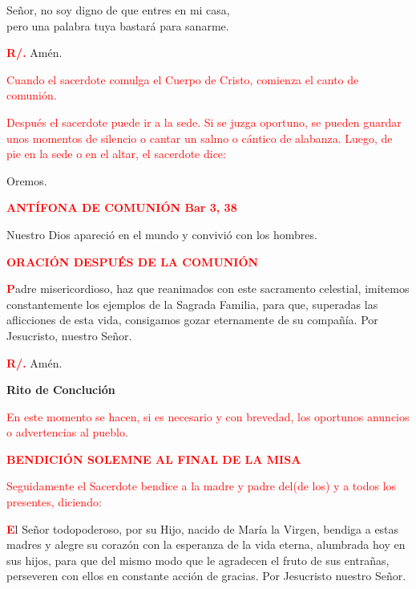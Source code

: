 \documentclass[12pt, letterpaper]{report}
\begin{document}
\noindent
\Large Se\~nor, no soy digno de que entres en mi casa,\\ 
pero una palabra tuya bastar\'a para sanarme.

\Large {\bfseries \textcolor{red}{R/.}} \hspace{0.5cm} Am\'en.

\large{\textcolor{red}{Cuando el sacerdote comulga el Cuerpo de Cristo, comienza el canto de comuni\'on.}}

\large{\textcolor{red}{Despu\'es el sacerdote puede ir a la sede. Si se juzga oportuno, se pueden guardar unos momentos de silencio o cantar un salmo o c\'antico de alabanza. Luego, de pie en la sede o en el altar, el sacerdote dice:}}

\noindent
\Large Oremos.

\large {\bfseries \textcolor{red}{ANT\'IFONA DE COMUNI\'ON \hspace{1cm} Bar 3, 38}}

\noindent
\Large Nuestro Dios apareci\'o en el mundo y convivi\'o con los hombres.

\large {\bfseries \textcolor{red}{ORACI\'ON DESPU\'ES DE LA COMUNI\'ON}}

\lettrine[lines=1]{\bfseries \textcolor{red}{P}}{}\Large adre misericordioso, haz que reanimados con este sacramento celestial, imitemos constantemente los ejemplos de la Sagrada Familia, para que, superadas las aflicciones de esta vida, consigamos gozar eternamente de su compa\~n\'ia. Por Jesucristo, nuestro Se\~nor.

\Large {\bfseries \textcolor{red}{R/.}} \hspace{0.5cm} Am\'en.


\newpage

\begin{center}
\Huge {\bfseries Rito de Concluci\'on}
\end{center}

\large{\textcolor{red}{En este momento se hacen, si es necesario y con brevedad, los oportunos anuncios o advertencias al pueblo.}}

\Large {\bfseries \textcolor{red}{BENDICI\'ON SOLEMNE AL FINAL DE LA MISA}}

\large{\textcolor{red}{Seguidamente el Sacerdote bendice a la madre y padre del(de los) y a todos los presentes, diciendo:}}

\lettrine[lines=1]{\bfseries \textcolor{red}{E}}{}\Large l Se\~nor todopoderoso, por su Hijo, nacido de Mar\'ia la Virgen, bendiga a estas madres y alegre su coraz\'on con la esperanza de la vida eterna, alumbrada hoy en sus hijos, para que del mismo modo que le agradecen el fruto de sus entra\~nas, perseveren con ellos en constante acci\'on de gracias. Por Jesucristo nuestro Se\~nor.
\end{document}
